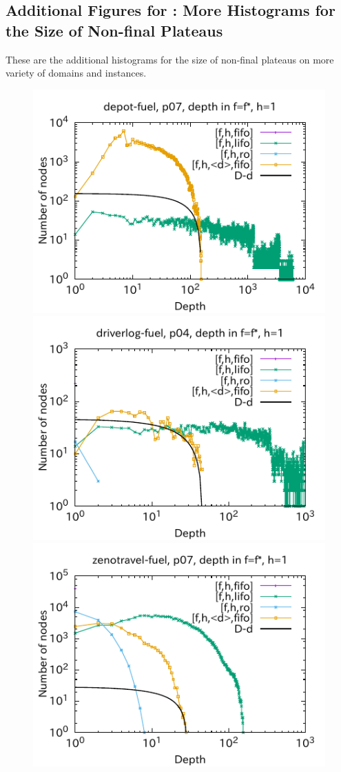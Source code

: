 \clearpage
\subsection{Additional Figures for : More Histograms for the Size of Non-final Plateaus}

These are the additional histograms for the size of non-final plateaus on
more variety of domains and instances.

\begin{figure}[htbp]
\includegraphics{img/output-lmcut/depot-fuel/p07-1.pdf}
\includegraphics{img/output-lmcut/driverlog-fuel/p04-1.pdf}
\includegraphics{img/output-lmcut/zenotravel-fuel/p07-1.pdf}

\end{figure}
